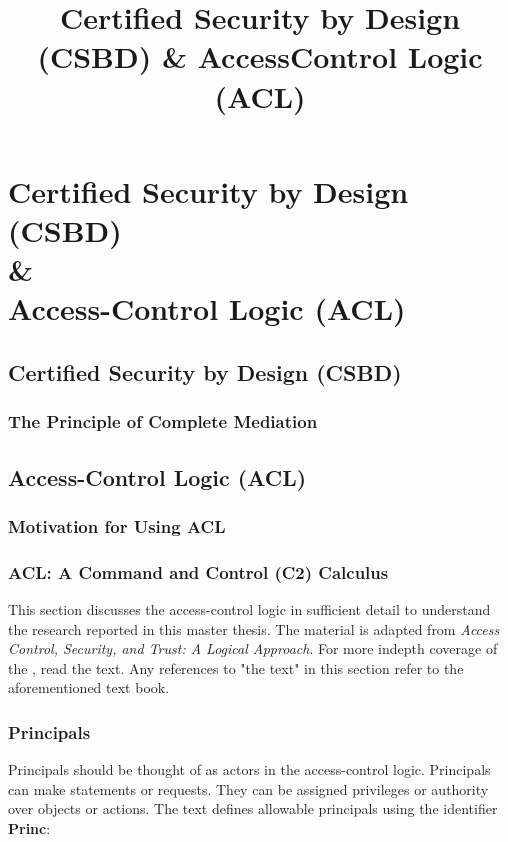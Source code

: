 \documentclass[../../main/main.tex]{subfiles}
\begin{document}
\title{Certified Security by Design (CSBD) \& Access\-Control Logic (ACL)}

\chapter[Certified Security by Design (CSBD) \& Access-Control Logic (ACL)]{Certified Security by Design (CSBD)  \\ \& \\ Access-Control Logic (ACL)} \label{chp:csbdacl}


\section{Certified Security by Design (CSBD)} \label{sec:csbd}

\subsection{The Principle of Complete Mediation}\label{ssec:pcompletemediation}

\section{Access-Control Logic (ACL)} \label{sec:acl}
\subsection{Motivation for Using ACL}\label{ssec:motivattionacl}
\subsection{ACL: A Command and Control (C2) Calculus} \label{ssec:aclc2}
This section discusses the access-control logic in sufficient detail to understand the research reported in this master thesis.  The material is adapted from \textit{Access Control, Security, and Trust: A Logical Approach}\cite{ChinOlder}.  For more indepth coverage of the , read the text.  Any references to "the text" in this section refer to the aforementioned text book.

\subsection{Principals}\label{ssec:principals}
Principals should be thought of as actors in the access-control logic.  Principals can make statements or requests.  They can be assigned privileges or authority over objects or actions.  The text defines allowable principals using the identifier \textbf{Princ}:
\end{document}
